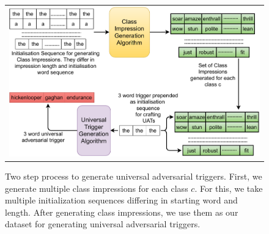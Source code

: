 \begin{figure}

 \centering
 \begin{tabular}{c}
\hspace{-0.3cm}\includegraphics[width=\textwidth]{images/2-stage-ci-uat-2.pdf}
 \end{tabular}

 \caption{\small 
 Two step process to generate universal adversarial triggers. First, we generate multiple class impressions for each class $c$. For this, we take multiple initialization sequences differing in starting word and length. After generating class impressions, we use them as our dataset for generating universal adversarial triggers.}

 \label{fig:2 stage ci uat}

\end{figure}



